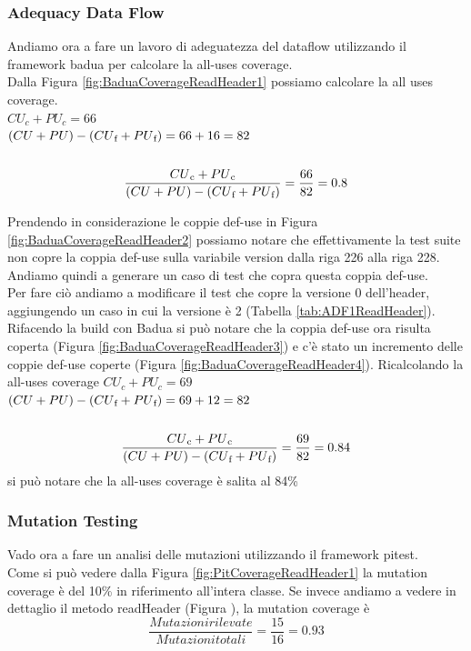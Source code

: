 \documentclass[12pt, a4paper]{article}
\begin{document}
\subsubsection{Adequacy Data Flow}

Andiamo ora a fare un lavoro di adeguatezza del dataflow utilizzando il framework badua per calcolare la all-uses coverage. \\
Dalla Figura \ref{fig:BaduaCoverageReadHeader1} possiamo calcolare la all uses coverage. \\

\(CU_c + PU_c = 66\) \\
\( (CU + PU) - (CU\textsubscript{f} + PU\textsubscript{f}) = 66 + 16 = 82\) \\ \\
\[\frac{{CU\textsubscript{c} + PU\textsubscript{c}}}{{(CU + PU) - (CU\textsubscript{f} + PU\textsubscript{f})}} = \frac{{66}}{{82}} = 0.8\]

Prendendo in considerazione le coppie def-use in Figura \ref{fig:BaduaCoverageReadHeader2} possiamo notare che
effettivamente la test suite non copre la coppia def-use sulla variabile version dalla riga 226 alla riga 228.
Andiamo quindi a generare un caso di test che copra questa coppia def-use. \\

Per fare ciò andiamo a modificare il test che copre la versione 0 dell'header, aggiungendo un caso in cui la versione
è 2 (Tabella \ref{tab:ADF1ReadHeader}).  Rifacendo la build con Badua si può notare che la coppia def-use ora risulta coperta (Figura \ref{fig:BaduaCoverageReadHeader3})
e c'è stato un incremento delle coppie def-use coperte (Figura \ref{fig:BaduaCoverageReadHeader4}). Ricalcolando
la all-uses coverage 
\(CU_c + PU_c = 69\) \\
\( (CU + PU) - (CU\textsubscript{f} + PU\textsubscript{f}) = 69 + 12 = 82\) \\ \\
\[\frac{{CU\textsubscript{c} + PU\textsubscript{c}}}{{(CU + PU) - (CU\textsubscript{f} + PU\textsubscript{f})}} = \frac{{69}}{{82}} = 0.84\]
si può notare che la all-uses coverage è salita al 84\% \\

\subsubsection{Mutation Testing}
Vado ora a fare un analisi delle mutazioni utilizzando il framework pitest. \\
Come si può vedere dalla Figura \ref{fig:PitCoverageReadHeader1} la mutation coverage è del 10\% in riferimento all'intera classe.
Se invece andiamo a vedere in dettaglio il metodo readHeader (Figura ), la mutation coverage è 
\[\frac{{Mutazioni rilevate}}{{Mutazioni totali}} = \frac{{15}}{{16}} = 0.93\]
\end{document}
